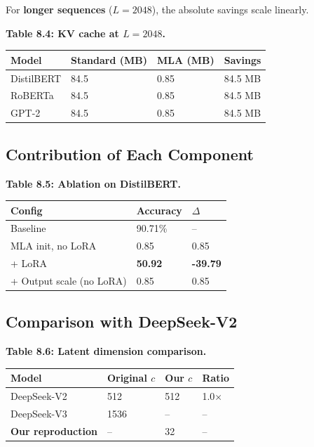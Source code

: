 For \textbf{longer sequences} ($L = 2048$), the absolute savings scale linearly.

\textbf{Table 8.4: KV cache at $L = 2048$.}

\begin{table}[H]
\centering
\small
\begin{tabular}{llll}
\toprule
\textbf{Model} & \textbf{Standard (MB)} & \textbf{MLA (MB)} & \textbf{Savings} \\
\midrule
DistilBERT & 84.5 & 0.85 & 84.5 MB \\
RoBERTa & 84.5 & 0.85 & 84.5 MB \\
GPT-2 & 84.5 & 0.85 & 84.5 MB \\
\bottomrule
\end{tabular}
\end{table}

\subsection{Contribution of Each Component}

\textbf{Table 8.5: Ablation on DistilBERT.}

\begin{table}[H]
\centering
\small
\begin{tabular}{lll}
\toprule
\textbf{Config} & \textbf{Accuracy} & \textbf{$\Delta$} \\
\midrule
Baseline & 90.71\% & -- \\
MLA init, no LoRA & 0.85 & 0.85 \\
+ LoRA & \textbf{50.92} & \textbf{-39.79} \\
+ Output scale (no LoRA) & 0.85 & 0.85 \\
\bottomrule
\end{tabular}
\end{table}

\subsection{Comparison with DeepSeek-V2}

\textbf{Table 8.6: Latent dimension comparison.}

\begin{table}[H]
\centering
\small
\begin{tabular}{llll}
\toprule
\textbf{Model} & \textbf{Original $c$} & \textbf{Our $c$} & \textbf{Ratio} \\
\midrule
DeepSeek-V2 & 512 & 512 & 1.0$\times$ \\
DeepSeek-V3 & 1536 & -- & -- \\
\textbf{Our reproduction} & -- & 32 & -- \\
\bottomrule
\end{tabular}
\end{table}

